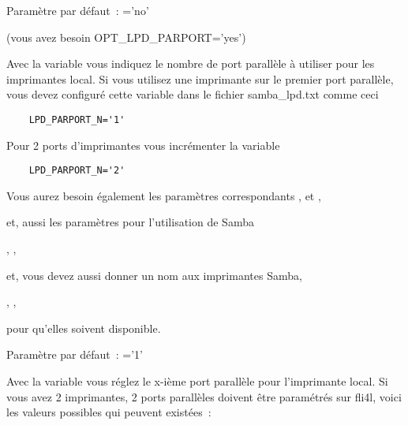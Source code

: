 \begin{description}
    Paramètre par défaut~: ='no'


 (vous avez besoin OPT\_LPD\_PARPORT='yes')

    Avec la variable  vous indiquez le nombre de port
    parallèle à utiliser pour les imprimantes local. Si vous utilisez une
    imprimante sur le premier port parallèle, vous devez configuré cette variable
    dans le fichier samba\_lpd.txt comme ceci

\begin{example}
\begin{verbatim}
    LPD_PARPORT_N='1'
\end{verbatim}
\end{example}

    Pour 2 ports d'imprimantes vous incrémenter la variable 

\begin{example}
\begin{verbatim}
    LPD_PARPORT_N='2'
\end{verbatim}
\end{example}

    Vous aurez besoin également les paramètres correspondants
        \emph{},
        \emph{}
        \emph{}
    et
        \emph{},
        \emph{}
        \emph{}

    et, aussi les paramètres pour l'utilisation de Samba

        \emph{},
        \emph{},

    et, vous devez aussi donner un nom aux imprimantes Samba,

        \emph{},
        \emph{},

    pour qu'elles soivent disponible.

    Paramètre par défaut~: ='1'



    Avec la variable  vous réglez le x-ième port
    parallèle pour l'imprimante local. Si vous avez 2 imprimantes, 2 ports
    parallèles doivent être paramétrés sur fli4l, voici les valeurs possibles
    qui peuvent existées~:


\end{description}
